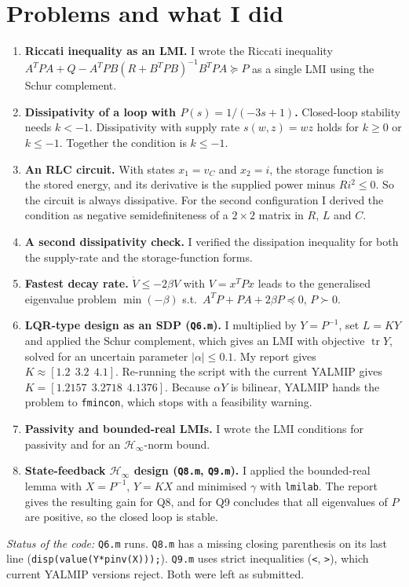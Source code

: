 


\section*{Problems and what I did}
\begin{enumerate}
  \item \textbf{Riccati inequality as an LMI.} I wrote the Riccati inequality $A^TPA+Q-A^TPB(R+B^TPB)^{-1}B^TPA \succeq P$ as a single LMI using the Schur complement.
  \item \textbf{Dissipativity of a loop with $P(s)=1/(-3s+1)$.} Closed-loop stability needs $k<-1$. Dissipativity with supply rate $s(w,z)=wz$ holds for $k\ge 0$ or $k\le -1$. Together the condition is $k\le-1$.
  \item \textbf{An RLC circuit.} With states $x_1=v_C$ and $x_2=i$, the storage function is the stored energy, and its derivative is the supplied power minus $Ri^2\le 0$. So the circuit is always dissipative. For the second configuration I derived the condition as negative semidefiniteness of a $2\times2$ matrix in $R$, $L$ and $C$.
  \item \textbf{A second dissipativity check.} I verified the dissipation inequality for both the supply-rate and the storage-function forms.
  \item \textbf{Fastest decay rate.} $\dot V \le -2\beta V$ with $V=x^TPx$ leads to the generalised eigenvalue problem $\min(-\beta)$ s.t.\ $A^TP+PA+2\beta P\preceq 0$, $P\succ 0$.
  \item \textbf{LQR-type design as an SDP (\texttt{Q6.m}).} I multiplied by $Y=P^{-1}$, set $L=KY$ and applied the Schur complement, which gives an LMI with objective $\operatorname{tr}Y$, solved for an uncertain parameter $|\alpha|\le 0.1$. My report gives $K\approx[1.2\ \ 3.2\ \ 4.1]$. Re-running the script with the current YALMIP gives $K=[1.2157\ \ 3.2718\ \ 4.1376]$. Because $\alpha Y$ is bilinear, YALMIP hands the problem to \texttt{fmincon}, which stops with a feasibility warning.
  \item \textbf{Passivity and bounded-real LMIs.} I wrote the LMI conditions for passivity and for an $\mathcal{H}_\infty$-norm bound.
  \item \textbf{State-feedback $\mathcal{H}_\infty$ design (\texttt{Q8.m}, \texttt{Q9.m}).} I applied the bounded-real lemma with $X=P^{-1}$, $Y=KX$ and minimised $\gamma$ with \texttt{lmilab}. The report gives the resulting gain for Q8, and for Q9 concludes that all eigenvalues of $P$ are positive, so the closed loop is stable.
\end{enumerate}

\textit{Status of the code:} \texttt{Q6.m} runs. \texttt{Q8.m} has a missing closing parenthesis on its last line (\texttt{disp(value(Y*pinv(X)));}). \texttt{Q9.m} uses strict inequalities (\texttt{<}, \texttt{>}), which current YALMIP versions reject. Both were left as submitted.


